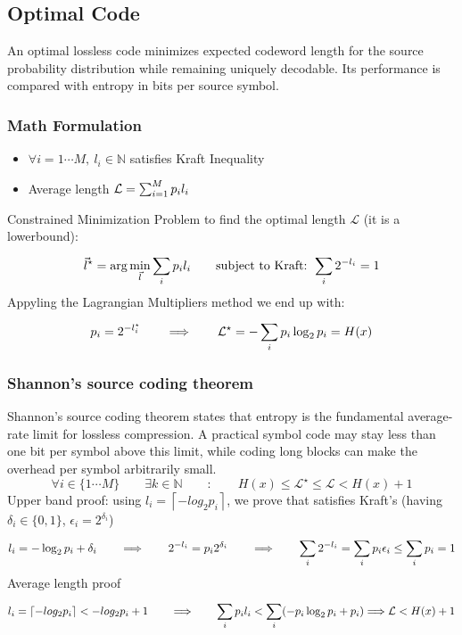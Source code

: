 \subsection{Optimal Code}
An optimal lossless code minimizes expected codeword length for the source probability distribution while remaining uniquely decodable. Its performance is compared with entropy in bits per source symbol.
\subsubsection{Math Formulation}
\begin{itemize}
    \item $\forall i = 1 \cdots M,\ l_i \in \mathbb{N}$ satisfies Kraft Inequality
    \item Average length $\mathcal{L} = \sr{M}{i=1}p_il_i$
\end{itemize}
Constrained Minimization Problem to find the optimal length $\mathcal{L}$ (it is a lowerbound): 
$$\vec{l}^\star = \arg\min_{\vec{l}}\sr{}{i}p_il_i \qquad\text{subject to Kraft: }\sr{}{i}2^{-l_i} = 1 $$
Appyling the Lagrangian Multipliers method we end up with:
$$p_i = 2^{-l_i^\star} \qquad\Longrightarrow\qquad \mathcal{L}^\star = -\sr{}{i}p_i \log_2 p_i = H(x)$$
\subsubsection{Shannon's source coding theorem}
Shannon's source coding theorem states that entropy is the fundamental average-rate limit for lossless compression. A practical symbol code may stay less than one bit per symbol above this limit, while coding long blocks can make the overhead per symbol arbitrarily small.
$$\forall i \in \{1\cdots M\} \qquad \exists k \in \mathbb{N} \qquad : \qquad H(x) \leq \mathcal{L}^\star \leq \mathcal{L} < H(x) + 1$$
Upper band proof: using $l_i = \left\lceil - log_2 p_i \right\rceil$, we prove that satisfies Kraft's (having $\delta_i \in \{0,1\}$, $\epsilon_i = 2^{\delta_i}$)
$$l_i = -\log_2 p_i + \delta_i \qquad\Longrightarrow\qquad 2^{-l_i} = p_i 2^{\delta_i} \qquad\Longrightarrow\qquad \sr{}{i}2^{-l_i} = \sr{}{i}p_i\epsilon_i \leq \sr{}{i}p_i = 1$$
Average length proof
$$l_i = \left\lceil - log_2 p_i \right\rceil < - log_2 p_i +1 \qquad \Longrightarrow \qquad \sr{}{i}p_i l_i < \sr{}{i}(-p_i \log_2 p_i + p_i) \Longrightarrow \mathcal{L} < H(x) + 1$$

